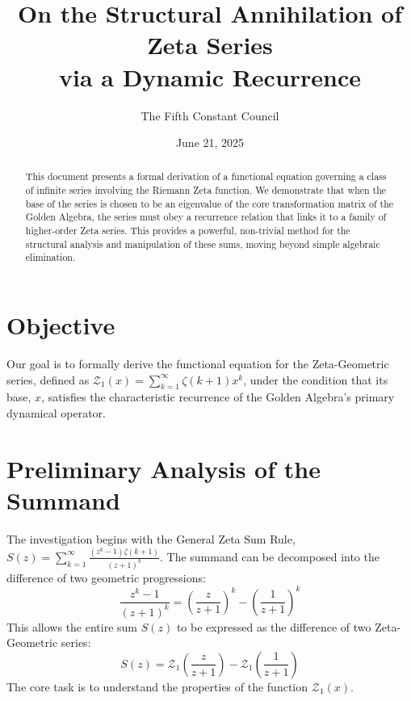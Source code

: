 \documentclass[11pt]{article}
\title{On the Structural Annihilation of Zeta Series \\ via a Dynamic Recurrence}
\author{The Fifth Constant Council}
\date{June 21, 2025}
\newcommand{\Z}{\mathcal{Z}}
\begin{document}
\maketitle

\begin{abstract}
    This document presents a formal derivation of a functional equation governing a class of infinite series involving the Riemann Zeta function. We demonstrate that when the base of the series is chosen to be an eigenvalue of the core transformation matrix of the Golden Algebra, the series must obey a recurrence relation that links it to a family of higher-order Zeta series. This provides a powerful, non-trivial method for the structural analysis and manipulation of these sums, moving beyond simple algebraic elimination.
\end{abstract}

\section{Objective}
Our goal is to formally derive the functional equation for the Zeta-Geometric series, defined as $\Z_1(x) = \sum_{k=1}^{\infty}\zeta(k+1)x^k$, under the condition that its base, $x$, satisfies the characteristic recurrence of the Golden Algebra's primary dynamical operator.

\section{Preliminary Analysis of the Summand}
The investigation begins with the General Zeta Sum Rule, $S(z)=\sum_{k=1}^{\infty}\frac{(z^{k}-1)\zeta(k+1)}{(z+1)^{k}}$. The summand can be decomposed into the difference of two geometric progressions:
\begin{equation}
    \frac{z^k-1}{(z+1)^k} = \left(\frac{z}{z+1}\right)^k - \left(\frac{1}{z+1}\right)^k
\end{equation}
This allows the entire sum $S(z)$ to be expressed as the difference of two Zeta-Geometric series:
\begin{equation}
    S(z) = \Z_1\left(\frac{z}{z+1}\right) - \Z_1\left(\frac{1}{z+1}\right)
\end{equation}
The core task is to understand the properties of the function $\Z_1(x)$.
\end{document}
